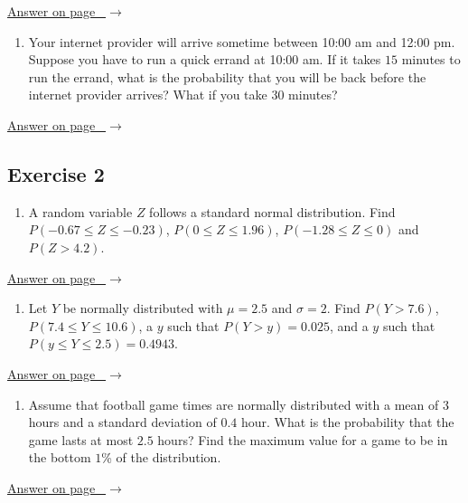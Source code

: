 \documentclass[
  11pt,
  letterpaper,
  DIV=11,
  numbers=noendperiod,
  oneside,
  open=any]{scrreprt}
\providecommand{\tightlist}{%
  \setlength{\itemsep}{0pt}\setlength{\parskip}{0pt}}\usepackage{longtable,booktabs,array}
\newcommand{\bsanswerref}[1]{%
  \par\nopagebreak\hypertarget{q-#1}{}\label{q-#1}%
  {\raggedleft\sffamily\footnotesize\hyperlink{a-#1}{\textcolor{bsaccent}{Answer on page \pageref{a-#1}\ $\rightarrow$}}\par}%
  \medskip}
\begin{document}
\bsanswerref{bsans97}

\begin{enumerate}
\def\labelenumi{\arabic{enumi}.}
\setcounter{enumi}{1}
\tightlist
\item
  Your internet provider will arrive sometime between 10:00 am and 12:00
  pm. Suppose you have to run a quick errand at 10:00 am. If it takes
  \(15\) minutes to run the errand, what is the probability that you
  will be back before the internet provider arrives? What if you take
  \(30\) minutes?
\end{enumerate}

\bsanswerref{bsans98}

\subsection*{Exercise 2}\label{exercise-2-9}

\begin{enumerate}
\def\labelenumi{\arabic{enumi}.}
\tightlist
\item
  A random variable \(Z\) follows a standard normal distribution. Find
  \(P(-0.67 \leq Z \leq -0.23)\), \(P(0 \leq Z \leq 1.96)\),
  \(P(-1.28 \leq Z \leq 0)\) and \(P(Z > 4.2)\).
\end{enumerate}

\bsanswerref{bsans99}

\begin{enumerate}
\def\labelenumi{\arabic{enumi}.}
\setcounter{enumi}{1}
\tightlist
\item
  Let \(Y\) be normally distributed with \(\mu=2.5\) and \(\sigma=2\).
  Find \(P(Y>7.6)\), \(P(7.4 \leq Y \leq 10.6)\), a \(y\) such that
  \(P(Y>y)=0.025\), and a \(y\) such that
  \(P(y \leq Y \leq 2.5)=0.4943\).
\end{enumerate}

\bsanswerref{bsans100}

\begin{enumerate}
\def\labelenumi{\arabic{enumi}.}
\setcounter{enumi}{2}
\tightlist
\item
  Assume that football game times are normally distributed with a mean
  of \(3\) hours and a standard deviation of \(0.4\) hour. What is the
  probability that the game lasts at most \(2.5\) hours? Find the
  maximum value for a game to be in the bottom \(1\)\% of the
  distribution.
\end{enumerate}

\bsanswerref{bsans101}
\end{document}
